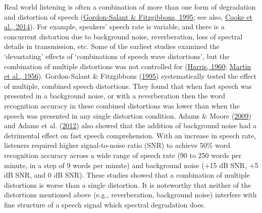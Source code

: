 \documentclass[a4paper, nobind]{templates/ociamthesis}
\begin{document}
Real world listening is often a combination of more than one form of degradation and distortion of speech (\protect\hyperlink{ref-Gordonsalant1995}{Gordon-Salant \& Fitzgibbons, 1995}; see also, \protect\hyperlink{ref-Cooke2014}{Cooke et al., 2014}).
For example, speakers' speech rate is variable, and there is a concurrent distortion due to background noise, reverberation, loss of spectral details in transmission, etc.
Some of the earliest studies examined the `devastating' effects of `combinations of speech wave distortions', but the combination of multiple distortions was not controlled for (\protect\hyperlink{ref-Harris1960}{Harris, 1960}; \protect\hyperlink{ref-Martin1956}{Martin et al., 1956}).
Gordon-Salant \& Fitzgibbons (\protect\hyperlink{ref-Gordonsalant1995}{1995}) systematically tested the effect of multiple, combined speech distortions.
They found that when fast speech was presented in a background noise, or with a reverberation then the word recognition accuracy in these combined distortions was lower than when the speech was presented in any single distortion condition.
Adams \& Moore (\protect\hyperlink{ref-Adams2009}{2009}) and Adams et al. (\protect\hyperlink{ref-Adams2012}{2012}) also showed that the addition of background noise had a detrimental effect on fast speech comprehension.
With an increase in speech rate, listeners required higher signal-to-noise ratio (SNR) to achieve 50\% word recognition accuracy across a wide range of speech rate (90 to 250 words per minute, in a step of 9 words per minute) and background noise (+15 dB SNR, +5 dB SNR, and 0 dB SNR).
These studies showed that a combination of multiple distortions is worse than a single distortion.
It is noteworthy that neither of the distortions mentioned above (e.g., reverberation, background noise) interfere with fine structure of a speech signal which spectral degradation does.
\end{document}
